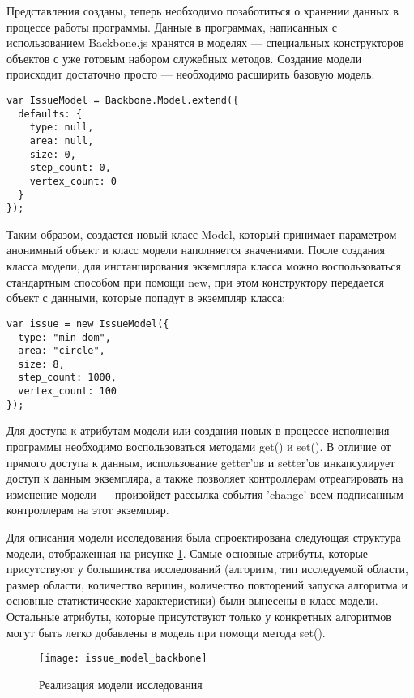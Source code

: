 Представления созданы, теперь необходимо позаботиться о хранении данных в процессе работы программы. Данные в программах, написанных с использованием Backbone.js хранятся в моделях --- специальных конструкторов объектов с уже готовым набором служебных методов. Создание модели происходит достаточно просто --- необходимо расширить базовую модель:
\begin{lstlisting}
var IssueModel = Backbone.Model.extend({
  defaults: {
    type: null,
    area: null,
    size: 0,
    step_count: 0,
    vertex_count: 0
  }
});
\end{lstlisting}
Таким образом, создается новый класс Model, который принимает параметром анонимный объект и класс модели наполняется значениями. После создания класса модели, для инстанцирования экземпляра класса можно воспользоваться стандартным способом при помощи new, при этом конструктору передается объект с данными, которые попадут в экземпляр класса:
\begin{lstlisting}
var issue = new IssueModel({
  type: "min_dom",
  area: "circle",
  size: 8,
  step_count: 1000,
  vertex_count: 100
});
\end{lstlisting}
Для доступа к атрибутам модели или создания новых в процессе исполнения программы необходимо воспользоваться методами get() и set(). В отличие от прямого доступа к данным, использование getter'ов и setter'ов инкапсулирует доступ к данным экземпляра, а также позволяет контроллерам отреагировать на изменение модели --- произойдет рассылка события 'change' всем подписанным контроллерам на этот экземпляр.

Для описания модели исследования была спроектирована следующая структура модели, отображенная на рисунке \ref{issue_model_backbone}. Самые основные атрибуты, которые присутствуют у большинства исследований (алгоритм, тип исследуемой области, размер области, количество вершин, количество повторений запуска алгоритма и основные статистические характеристики) были вынесены в класс модели. Остальные атрибуты, которые присутствуют только у конкретных алгоритмов могут быть легко добавлены в модель при помощи метода set().

\begin{figure}[ht]
\center\texttt{[image: issue\_model\_backbone]}
\caption{Реализация модели исследования}\label{issue_model_backbone}
\end{figure}
